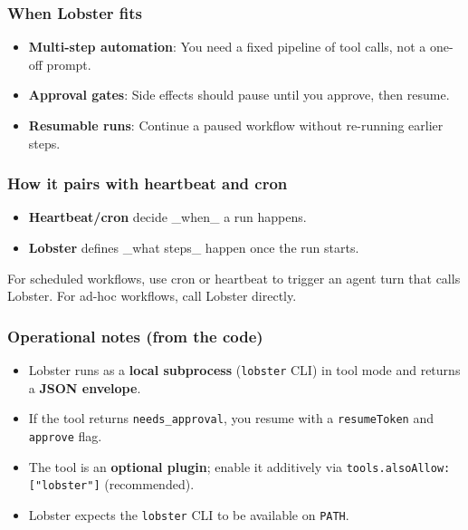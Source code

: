 \subsubsection{When Lobster fits}


\begin{itemize}
  \item \textbf{Multi-step automation}: You need a fixed pipeline of tool calls, not a one-off prompt.
  \item \textbf{Approval gates}: Side effects should pause until you approve, then resume.
  \item \textbf{Resumable runs}: Continue a paused workflow without re-running earlier steps.
\end{itemize}


\subsubsection{How it pairs with heartbeat and cron}


\begin{itemize}
  \item \textbf{Heartbeat/cron} decide \_when\_ a run happens.
  \item \textbf{Lobster} defines \_what steps\_ happen once the run starts.
\end{itemize}


For scheduled workflows, use cron or heartbeat to trigger an agent turn that calls Lobster.
For ad-hoc workflows, call Lobster directly.

\subsubsection{Operational notes (from the code)}


\begin{itemize}
  \item Lobster runs as a \textbf{local subprocess} (\texttt{lobster} CLI) in tool mode and returns a \textbf{JSON envelope}.
  \item If the tool returns \texttt{needs\_approval}, you resume with a \texttt{resumeToken} and \texttt{approve} flag.
  \item The tool is an \textbf{optional plugin}; enable it additively via \texttt{tools.alsoAllow: ["lobster"]} (recommended).
  \item Lobster expects the \texttt{lobster} CLI to be available on \texttt{PATH}.
\end{itemize}


